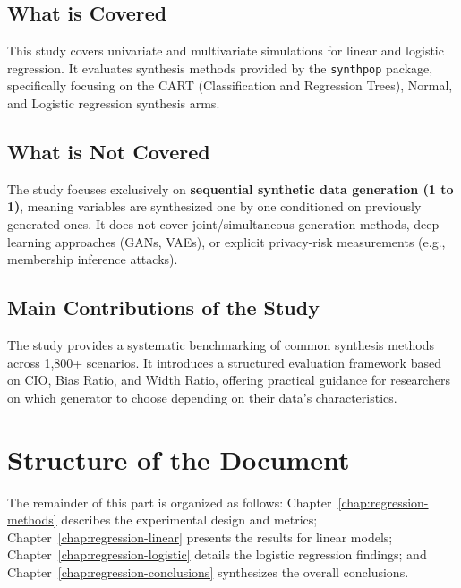 \subsection{What is Covered}
This study covers univariate and multivariate simulations for linear and logistic regression. It evaluates synthesis methods provided by the \texttt{synthpop} package, specifically focusing on the CART (Classification and Regression Trees), Normal, and Logistic regression synthesis arms.

\subsection{What is Not Covered}
The study focuses exclusively on \textbf{sequential synthetic data generation (1 to 1)}, meaning variables are synthesized one by one conditioned on previously generated ones. It does not cover joint/simultaneous generation methods, deep learning approaches (GANs, VAEs), or explicit privacy-risk measurements (e.g., membership inference attacks).

\subsection{Main Contributions of the Study}
The study provides a systematic benchmarking of common synthesis methods across 1,800+ scenarios. It introduces a structured evaluation framework based on CIO, Bias Ratio, and Width Ratio, offering practical guidance for researchers on which generator to choose depending on their data's characteristics.

\section{Structure of the Document}
\label{sec:reg-structure}
The remainder of this part is organized as follows: Chapter~\ref{chap:regression-methods} describes the experimental design and metrics; Chapter~\ref{chap:regression-linear} presents the results for linear models; Chapter~\ref{chap:regression-logistic} details the logistic regression findings; and Chapter~\ref{chap:regression-conclusions} synthesizes the overall conclusions.
